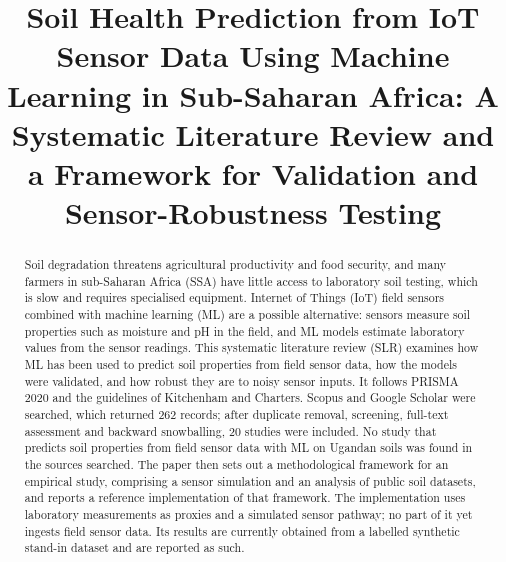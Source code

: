 \documentclass[conference]{IEEEtran}
\begin{document}
\title{Soil Health Prediction from IoT Sensor Data Using Machine Learning
in Sub-Saharan Africa: A Systematic Literature Review and a Framework for
Validation and Sensor-Robustness Testing}

\author{
}

\maketitle

\begin{abstract}
Soil degradation threatens agricultural productivity and food security, and
many farmers in sub-Saharan Africa (SSA) have little access to laboratory
soil testing, which is slow and requires specialised equipment. Internet of
Things (IoT) field sensors combined with machine learning (ML) are a possible
alternative: sensors measure soil properties such as moisture and pH in the
field, and ML models estimate laboratory values from the sensor readings. This
systematic literature review (SLR) examines how ML has been used to predict
soil properties from field sensor data, how the models were validated, and how
robust they are to noisy sensor inputs. It follows PRISMA 2020 and the
guidelines of Kitchenham and Charters. Scopus and Google Scholar were searched,
which returned 262 records; after duplicate removal, screening, full-text
assessment and backward snowballing, 20 studies were included. No study that
predicts soil properties from field sensor data with ML on Ugandan soils was
found in the sources searched. The paper then sets out a methodological
framework for an empirical study, comprising a sensor simulation and an
analysis of public soil datasets, and reports a reference implementation of
that framework. The implementation uses laboratory measurements as proxies and
a simulated sensor pathway; no part of it yet ingests field sensor data. Its
results are currently obtained from a labelled synthetic stand-in dataset and
are reported as such.
\end{abstract}
\end{document}
